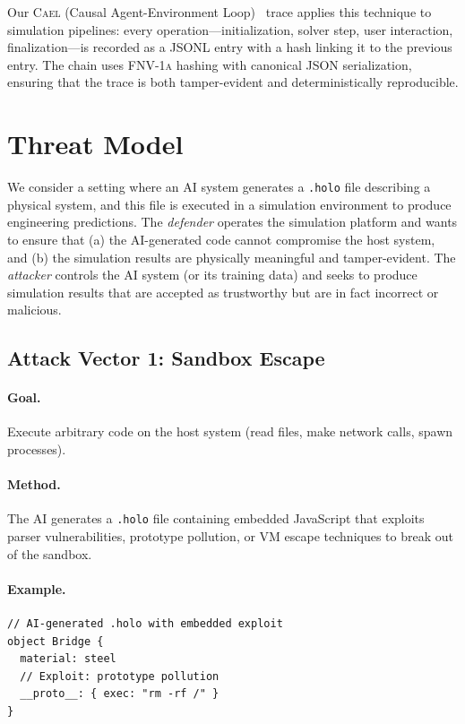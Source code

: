 \documentclass[letterpaper,twocolumn,10pt]{article}
\newcommand{\cael}{\textsc{Cael}}
\newcommand{\fnvhash}{\textsc{FNV-1a}}
\begin{document}
Our \cael{} (Causal Agent-Environment Loop)~\cite{cael-paper} trace applies this
technique to simulation pipelines: every operation---initialization,
solver step, user interaction, finalization---is recorded as a JSONL
entry with a hash linking it to the previous entry. The chain uses
\fnvhash{} hashing with canonical JSON serialization, ensuring that
the trace is both tamper-evident and deterministically reproducible.


\section{Threat Model}
\label{sec:threat}

We consider a setting where an AI system generates a \texttt{.holo}
file describing a physical system, and this file is executed in a
simulation environment to produce engineering predictions. The
\emph{defender} operates the simulation platform and wants to ensure
that (a) the AI-generated code cannot compromise the host system, and
(b) the simulation results are physically meaningful and tamper-evident.
The \emph{attacker} controls the AI system (or its training data) and
seeks to produce simulation results that are accepted as trustworthy
but are in fact incorrect or malicious.

\subsection{Attack Vector 1: Sandbox Escape}

\paragraph{Goal.} Execute arbitrary code on the host system (read
files, make network calls, spawn processes).

\paragraph{Method.} The AI generates a \texttt{.holo} file containing
embedded JavaScript that exploits parser vulnerabilities, prototype
pollution, or VM escape techniques to break out of the sandbox.

\paragraph{Example.}
\begin{lstlisting}[language=HoloScript]
// AI-generated .holo with embedded exploit
object Bridge {
  material: steel
  // Exploit: prototype pollution
  __proto__: { exec: "rm -rf /" }
}
\end{lstlisting}
\end{document}
